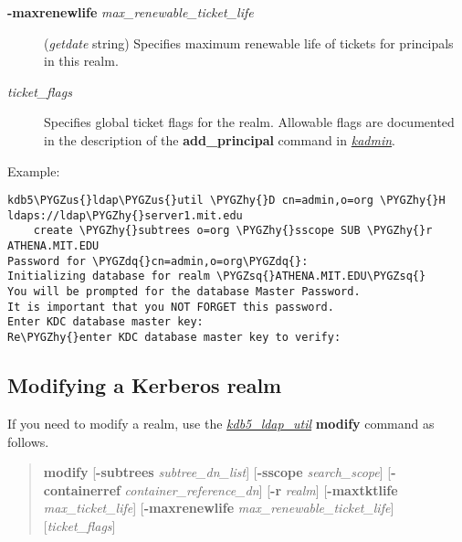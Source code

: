 \documentclass[letterpaper,10pt,english]{sphinxmanual}
\def\PYGZus{\char`\_}
\def\PYGZhy{\char`\-}
\def\PYGZsq{\char`\'}
\def\PYGZdq{\char`\"}
\begin{document}
\begin{description}
\item[{\textbf{-maxrenewlife} \emph{max\_renewable\_ticket\_life}}] \leavevmode
(\emph{getdate} string) Specifies maximum renewable life of
tickets for principals in this realm.

\item[{\emph{ticket\_flags}}] \leavevmode
Specifies global ticket flags for the realm.  Allowable flags are
documented in the description of the \textbf{add\_principal} command in
{\hyperref[admin/admin_commands/kadmin_local:kadmin-1]{\emph{kadmin}}}.

\end{description}

Example:

\begin{Verbatim}[commandchars=\\\{\}]
kdb5\PYGZus{}ldap\PYGZus{}util \PYGZhy{}D cn=admin,o=org \PYGZhy{}H ldaps://ldap\PYGZhy{}server1.mit.edu
    create \PYGZhy{}subtrees o=org \PYGZhy{}sscope SUB \PYGZhy{}r ATHENA.MIT.EDU
Password for \PYGZdq{}cn=admin,o=org\PYGZdq{}:
Initializing database for realm \PYGZsq{}ATHENA.MIT.EDU\PYGZsq{}
You will be prompted for the database Master Password.
It is important that you NOT FORGET this password.
Enter KDC database master key:
Re\PYGZhy{}enter KDC database master key to verify:
\end{Verbatim}


\subsection{Modifying a Kerberos realm}
\label{admin/database:ldap-mod-realm}\label{admin/database:modifying-a-kerberos-realm}
If you need to modify a realm, use the {\hyperref[admin/admin_commands/kdb5_ldap_util:kdb5-ldap-util-8]{\emph{kdb5\_ldap\_util}}}
\textbf{modify} command as follows.
\begin{quote}

\textbf{modify}
{[}\textbf{-subtrees} \emph{subtree\_dn\_list}{]}
{[}\textbf{-sscope} \emph{search\_scope}{]}
{[}\textbf{-containerref} \emph{container\_reference\_dn}{]}
{[}\textbf{-r} \emph{realm}{]}
{[}\textbf{-maxtktlife} \emph{max\_ticket\_life}{]}
{[}\textbf{-maxrenewlife} \emph{max\_renewable\_ticket\_life}{]}
{[}\emph{ticket\_flags}{]}
\end{quote}
\end{document}
